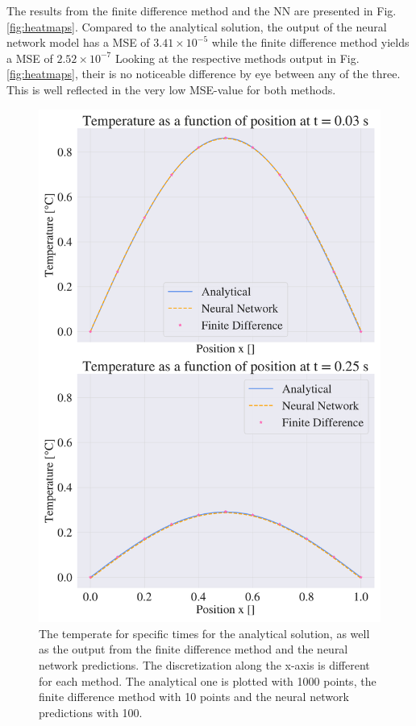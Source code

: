 The results from the finite difference method and the NN are presented in Fig. \ref{fig:heatmaps}.
Compared to the analytical solution, the output of the neural network model has a MSE of $ 3.41 \times 10^{-5}$ while the finite difference method yields a MSE of $2.52 \times 10^{-7}$
Looking at the respective methods output in Fig. \ref{fig:heatmaps}, their is no noticeable difference by eye between any of the three.  
This is well reflected in the very low MSE-value for both methods. 

\begin{figure}[h!]
    \centering
    \includegraphics[width=1.0\linewidth]{project_3/plots/time_slices_comparison.pdf}
    \caption{The temperate for specific times for the analytical solution, as well as the output from the finite difference method and the neural network predictions. The discretization along the x-axis is different for each method. The analytical one is plotted with 1000 points, the finite difference method with 10 points and the neural network predictions with 100. }
    \label{fig:timeslices}
\end{figure}




